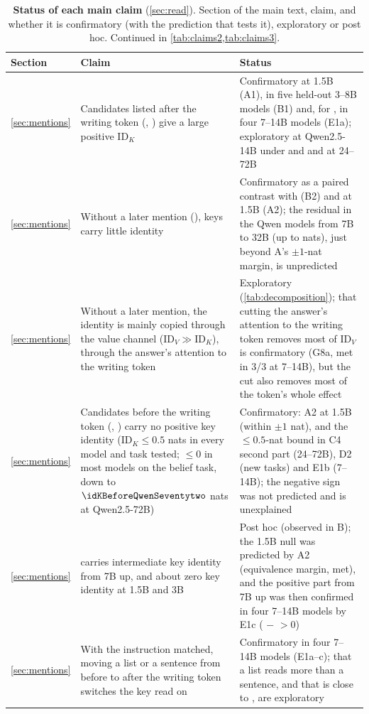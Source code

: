 \begin{table}[p]
\centering
\footnotesize
\caption{\textbf{Status of each main claim} (\cref{sec:read}). Section of the main text, claim, and whether it is confirmatory (with the prediction that tests it), exploratory or post hoc. Continued in \cref{tab:claims2,tab:claims3}.}
\label{tab:claims}
\begin{tabular}{p{}p{}p{}}
\toprule
Section & Claim & Status \\
\midrule
\cref{sec:mentions} & Candidates listed after the writing token (\fmtOpt{}, \fmtLetter{}) give a large positive $\mathrm{ID}_K$ & Confirmatory at 1.5B (A1), in five held-out 3--8B models (B1) and, for \fmtListA{}, in four 7--14B models (E1a); exploratory at Qwen2.5-14B under \fmtOpt{} and \fmtLetter{} and at 24--72B \\
\cref{sec:mentions} & Without a later mention (\fmtNone{}), keys carry little identity & Confirmatory as a paired contrast with \fmtOpt{} (B2) and at 1.5B (A2); the residual in the Qwen models from 7B to 32B (up to \noneMax{} nats), just beyond A's $\pm 1$-nat margin, is unpredicted \\
\cref{sec:mentions} & Without a later mention, the identity is mainly copied through the value channel ($\mathrm{ID}_V \gg \mathrm{ID}_K$), through the answer's attention to the writing token & Exploratory (\cref{tab:decomposition}); that cutting the answer's attention to the writing token removes most of $\mathrm{ID}_V$ is confirmatory (G8a, met in 3/3 at 7--14B), but the cut also removes most of the token's whole effect \\
\cref{sec:mentions} & Candidates before the writing token (\fmtBefore{}, \fmtSentB{}) carry no positive key identity ($\mathrm{ID}_K \leq 0.5$ nats in every model and task tested; $\leq 0$ in most models on the belief task, down to $\idKBeforeQwenSeventytwo$ nats at Qwen2.5-72B) & Confirmatory: A2 at 1.5B (within $\pm 1$ nat), and the $\leq 0.5$-nat bound in C4 second part (24--72B), D2 (new tasks) and E1b (7--14B); the negative sign was not predicted and is unexplained \\
\cref{sec:mentions} & \fmtPost{} carries intermediate key identity from 7B up, and about zero key identity at 1.5B and 3B & Post hoc (observed in B); the 1.5B null was predicted by A2 (equivalence margin, met), and the positive part from 7B up was then confirmed in four 7--14B models by E1c (\fmtPost{} $-$ \fmtSentB{} $> 0$) \\
\cref{sec:mentions} & With the instruction matched, moving a list or a sentence from before to after the writing token switches the key read on & Confirmatory in four 7--14B models (E1a--c); that a list reads more than a sentence, and that \fmtListA{} is close to \fmtOpt{}, are exploratory \\

\end{tabular}
\end{table}
